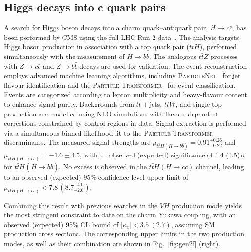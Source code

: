 \documentclass[a4paper,11pt]{article}
\begin{document}
\subsection{Higgs decays into c quark pairs}

A search for Higgs boson decays into a charm quark--antiquark pair,
$H\to c\bar{c}$, has been performed by CMS using the full LHC Run 2
data~\cite{tthcc-cms}. The analysis targets Higgs boson production in
association with a top quark pair ($t\bar{t}H$), performed
simultaneously with the measurement of $H\to b\bar{b}$. The analogous
$t\bar{t}Z$ processes with $Z\to c\bar{c}$ and $Z\to b\bar{b}$ decays
are used for validation. The event reconstruction employs advanced
machine learning algorithms, including
\textsc{ParticleNet}~\cite{pnet} for jet flavour identification and
the \textsc{Particle Transformer}~\cite{ptran} for event
classification. Events are categorized according to lepton
multiplicity and heavy-flavour content to enhance signal purity.
%
Backgrounds from $t\bar{t}+$jets, $t\bar{t}W$, and single-top
production are modelled using NLO simulations with flavour-dependent
corrections constrained by control regions in data. Signal extraction
is performed via a simultaneous binned likelihood fit to the
\textsc{Particle Transformer} discriminants. The measured signal
strengths are $\mu_{t\bar{t}H(H\to b\bar{b})}=0.91^{+0.26}_{-0.22}$
and $\mu_{t\bar{t}H(H\to c\bar{c})}=-1.6\pm4.5$, with an observed
(expected) significance of 4.4 (4.5)\,$\sigma$ for $t\bar{t}H(H\to
b\bar{b})$. No excess is observed in the $t\bar{t}H(H\to c\bar{c})$
channel, leading to an observed (expected) 95\% confidence level upper
limit of $\mu_{t\bar{t}H(H\to c\bar{c})}<7.8~(8.7^{+4.0}_{-2.6})$.

Combining this result with previous searches in the $VH$ production
mode yields the most stringent constraint to date on the charm Yukawa
coupling, with an observed (expected) 95\% CL bound of
$|\kappa_c|<3.5~(2.7)$, assuming SM production cross sections. The
corresponding upper limits in the two production modes, as well as
their combination are shown in Fig.~\ref{fig:gen2f} (right).
\end{document}
